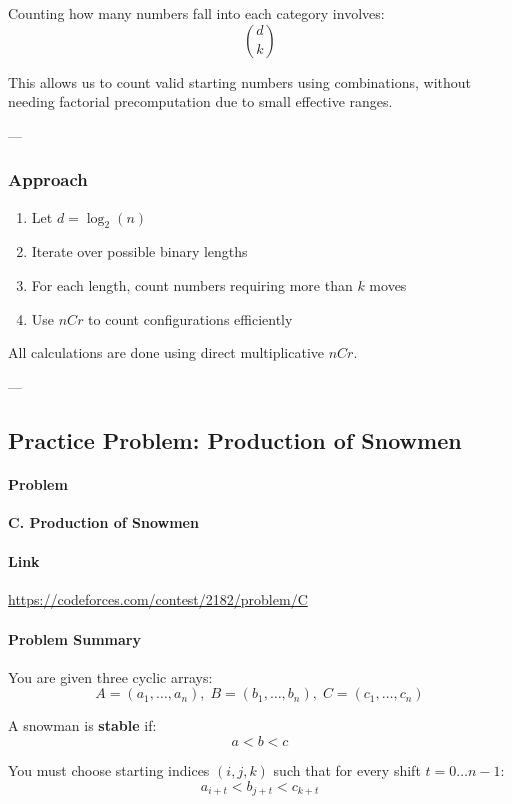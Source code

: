 \documentclass[11pt]{article}
\begin{document}
Counting how many numbers fall into each category involves:
\[
\binom{d}{k}
\]

This allows us to count valid starting numbers using combinations,
without needing factorial precomputation due to small effective ranges.

---

\subsubsection{Approach}

\begin{enumerate}
    \item Let $d = \log_2(n)$
    \item Iterate over possible binary lengths
    \item For each length, count numbers requiring more than $k$ moves
    \item Use $nCr$ to count configurations efficiently
\end{enumerate}

All calculations are done using direct multiplicative $nCr$.

---

\subsection{Practice Problem: Production of Snowmen}

\paragraph{Problem}
\textbf{C. Production of Snowmen}

\paragraph{Link}
\url{https://codeforces.com/contest/2182/problem/C}

\paragraph{Problem Summary}

You are given three cyclic arrays:
\[
A = (a_1,\dots,a_n),\;
B = (b_1,\dots,b_n),\;
C = (c_1,\dots,c_n)
\]

A snowman is \textbf{stable} if:
\[
a < b < c
\]

You must choose starting indices $(i, j, k)$ such that for every shift
$t = 0 \dots n-1$:
\[
a_{i+t} < b_{j+t} < c_{k+t}
\]
\end{document}
